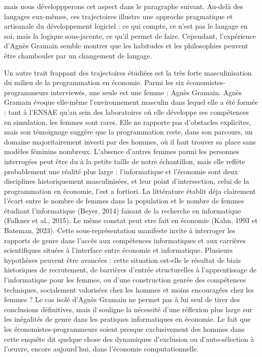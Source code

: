 mais nous développperons cet aspect dans le paragraphe suivant. Au-delà des langages eux-mêmes, ces trajectoires illustre une approche pragmatique et artisanale du développement logiciel : ce qui compte, ce n’est pas le langage en soi, mais la logique sous-jacente, ce qu’il permet de faire. Cependant, l’expérience d’Agnès Gramain semble montrer que les habitudes et les philosophies peuvent être chambouler par un changement de langage.


Un autre trait frappant des trajectoires étudiées est la très forte masculinisation du milieu de la programmation en économie. Parmi les six économistes-programmeurs interviewés, une seule est une femme : Agnès Gramain. Agnès Gramain évoque elle-même l’environnement masculin dans lequel elle a été formée : tant à l’ENSAE qu’au sein des laboratoires où elle développe ses compétences en simulation, les femmes sont rares. Elle ne rapporte pas d’obstacles explicites, mais son témoignage suggère que la programmation reste, dans son parcours, un domaine majoritairement investi par des hommes, où il faut trouver sa place sans modèles féminins nombreux. L’absence d’autres femmes parmi les personnes interrogées peut être du à la petite taille de notre échantillon, mais elle reflète probablement une réalité plus large : l’informatique et l’économie sont deux disciplines historiquement masculinisées, et leur point d’intersection, celui de la programmation en économie, l’est a fortiori. La littérature établit déja clairement l'écart entre le nombre de femmes dans la population et le nombre de femmes étudiant l'informatique (Beyer, 2014\cite{beyerWhyAreWomen2014}) faisant de la recherche en informatique (Falkner et al., 2015\cite{falknerGenderGapAcademia2015}). Le même constat peut etre fait en économie (Kahn, 1993\cite{kahnGenderDifferencesAcademic1993} et Bateman, 2023\cite{batemanGenderGapUK2023}). Cette sous-représentation manifeste invite à interroger les rapports de genre dans l’accès aux compétences informatiques et aux carrières scientifiques situées à l’interface entre économie et informatique. Plusieurs hypothèses peuvent être avancées : cette situation est-elle le résultat de biais historiques de recrutement, de barrières d’entrée structurelles à l’apprentissage de l’informatique pour les femmes, ou d’une construction genrée des compétences techniques, socialement valorisées chez les hommes et moins encouragées chez les femmes ? Le cas isolé d’Agnès Gramain ne permet pas à lui seul de tirer des conclusions définitives, mais il souligne la nécessité d’une réflexion plus large sur les inégalités de genre dans les pratiques informatiques en économie. Le fait que les économistes-programmeurs soient presque exclusivement des hommes dans cette enquête dit quelque chose des dynamiques d’exclusion ou d’auto-sélection à l’œuvre, encore aujourd’hui, dans l’économie computationnelle.

